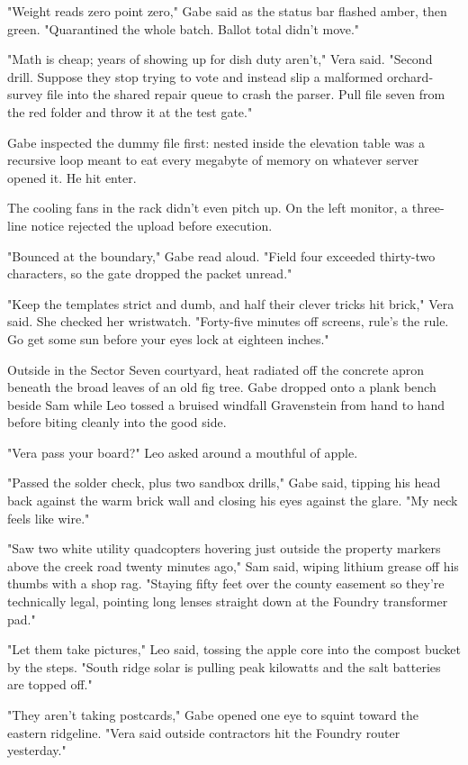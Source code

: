 "Weight reads zero point zero," Gabe said as the status bar flashed amber, then green. "Quarantined the whole batch. Ballot total didn't move."

"Math is cheap; years of showing up for dish duty aren't," Vera said. "Second drill. Suppose they stop trying to vote and instead slip a malformed orchard-survey file into the shared repair queue to crash the parser. Pull file seven from the red folder and throw it at the test gate."

Gabe inspected the dummy file first: nested inside the elevation table was a recursive loop meant to eat every megabyte of memory on whatever server opened it. He hit enter.

The cooling fans in the rack didn't even pitch up. On the left monitor, a three-line notice rejected the upload before execution.

"Bounced at the boundary," Gabe read aloud. "Field four exceeded thirty-two characters, so the gate dropped the packet unread."

"Keep the templates strict and dumb, and half their clever tricks hit brick," Vera said. She checked her wristwatch. "Forty-five minutes off screens, rule's the rule. Go get some sun before your eyes lock at eighteen inches."

Outside in the Sector Seven courtyard, heat radiated off the concrete apron beneath the broad leaves of an old fig tree. Gabe dropped onto a plank bench beside Sam while Leo tossed a bruised windfall Gravenstein from hand to hand before biting cleanly into the good side.

"Vera pass your board?" Leo asked around a mouthful of apple.

"Passed the solder check, plus two sandbox drills," Gabe said, tipping his head back against the warm brick wall and closing his eyes against the glare. "My neck feels like wire."

"Saw two white utility quadcopters hovering just outside the property markers above the creek road twenty minutes ago," Sam said, wiping lithium grease off his thumbs with a shop rag. "Staying fifty feet over the county easement so they're technically legal, pointing long lenses straight down at the Foundry transformer pad."

"Let them take pictures," Leo said, tossing the apple core into the compost bucket by the steps. "South ridge solar is pulling peak kilowatts and the salt batteries are topped off."

"They aren't taking postcards," Gabe opened one eye to squint toward the eastern ridgeline. "Vera said outside contractors hit the Foundry router yesterday."

